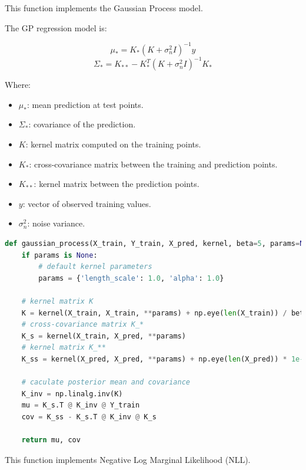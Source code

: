 \documentclass{homework}
\begin{document}
This function implements the Gaussian Process model.

The GP regression model is:

\[
\mu_* = K_*(K + \sigma_n^2 I)^{-1} y
\]
\[
\Sigma_* = K_{**} - K_*^T(K + \sigma_n^2 I)^{-1}K_*
\]

Where:

\begin{itemize}
    \item \( \mu_* \): mean prediction at test points.
    \item \( \Sigma_* \): covariance of the prediction.
    \item \( K \): kernel matrix computed on the training points.
    \item \( K_* \): cross-covariance matrix between the training and prediction points.
    \item \( K_{**} \): kernel matrix between the prediction points.
    \item \( y \): vector of observed training values.
    \item \( \sigma_n^2 \): noise variance.
\end{itemize}

\begin{lstlisting}[language=Python]
def gaussian_process(X_train, Y_train, X_pred, kernel, beta=5, params=None):
    if params is None:
        # default kernel parameters
        params = {'length_scale': 1.0, 'alpha': 1.0}
    
    # kernel matrix K
    K = kernel(X_train, X_train, **params) + np.eye(len(X_train)) / beta
    # cross-covariance matrix K_*
    K_s = kernel(X_train, X_pred, **params)
    # kernel matrix K_**
    K_ss = kernel(X_pred, X_pred, **params) + np.eye(len(X_pred)) * 1e-8
    
    # caculate posterior mean and covariance
    K_inv = np.linalg.inv(K)
    mu = K_s.T @ K_inv @ Y_train
    cov = K_ss - K_s.T @ K_inv @ K_s
    
    return mu, cov
\end{lstlisting}

This function implements Negative Log Marginal Likelihood (NLL).

\end{document}
